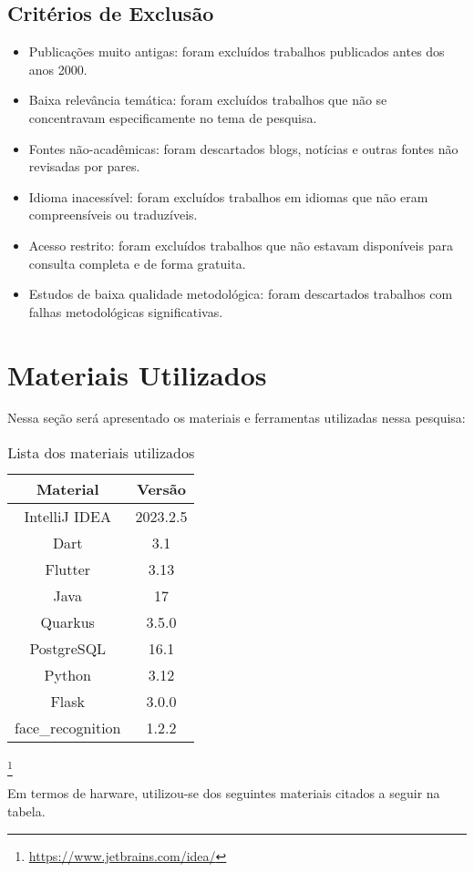 \subsection{Critérios de Exclusão}\label{subsec:criterios-de-exclusao}

\begin{itemize}
    \item Publicações muito antigas: foram excluídos trabalhos publicados antes dos anos 2000.
    \item Baixa relevância temática: foram excluídos trabalhos que não se concentravam especificamente no tema de pesquisa.
    \item Fontes não-acadêmicas: foram descartados blogs, notícias e outras fontes não revisadas por pares.
    \item Idioma inacessível: foram excluídos trabalhos em idiomas que não eram compreensíveis ou traduzíveis.
    \item Acesso restrito: foram excluídos trabalhos que não estavam disponíveis para consulta completa e de forma gratuita.
    \item Estudos de baixa qualidade metodológica: foram descartados trabalhos com falhas metodológicas significativas.
\end{itemize}


\section{Materiais Utilizados}\label{sec:materiais-utilizados}
Nessa seção será apresentado os materiais e ferramentas utilizadas nessa pesquisa:

\begin{table}[H]
    \centering
    \caption{Lista dos materiais utilizados}
    \label{tab:my-table}
    \begin{tabular}{|c|c|}
        \hline
        \textbf{Material} & \textbf{Versão} \\ \hline
        IntelliJ IDEA     & 2023.2.5        \\ \hline
        Dart              & 3.1             \\ \hline
        Flutter           & 3.13            \\ \hline
        Java              & 17              \\ \hline
        Quarkus           & 3.5.0           \\ \hline
        PostgreSQL        & 16.1            \\ \hline
        Python            & 3.12            \\ \hline
        Flask             & 3.0.0           \\ \hline
        face\_recognition & 1.2.2           \\ \hline
    \end{tabular}
\end{table}

\footnote{\url{https://www.jetbrains.com/idea/}}

Em termos de harware, utilizou-se dos seguintes materiais citados a seguir na
tabela.